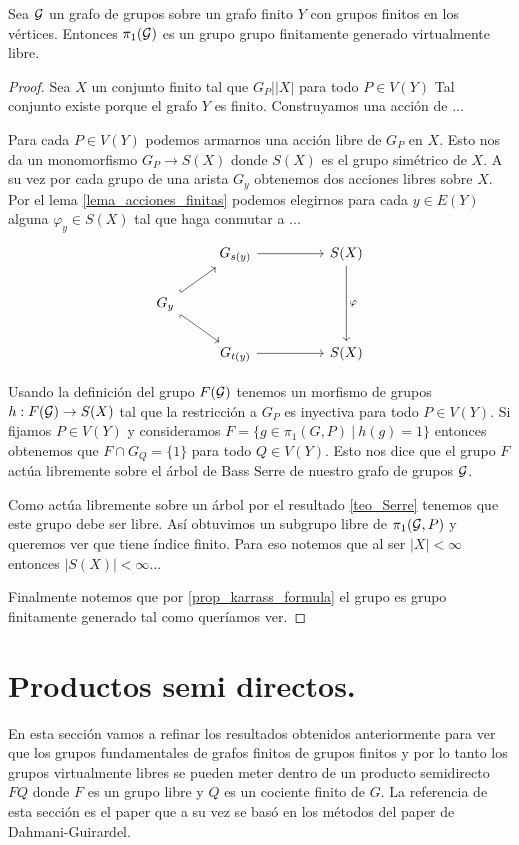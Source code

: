 \documentclass[tesis.tex]{subfiles}
\newcommand{\fg}{grupo finitamente generado }
\newcommand{\cG}{ {\cal G} }
\begin{document}
\begin{teo}\cite{karrass1973finite}
	Sea $\cal G$ un grafo de grupos sobre un grafo finito $Y$ con grupos finitos en los vértices.
	Entonces $\pi_1(\cal G)$ es un grupo \fg virtualmente libre.
\end{teo}
\begin{proof}
	Sea $X$ un conjunto finito tal que $G_P | |X|$ para todo $P \in V(Y)$
	Tal conjunto existe porque el grafo $Y$ es finito.
	Construyamos una acción de ...
	
	
	Para cada $P \in V(Y)$ podemos armarnos una acción libre de $G_P$ en $X$. 
	Esto nos da un monomorfismo $G_P \to S(X)$ donde $S(X)$ es el grupo simétrico de $X$.
	A su vez por cada grupo de una arista $G_y$ obtenemos dos acciones libres sobre $X$.
	Por el lema \ref{lema_acciones_finitas} podemos elegirnos para cada $y \in E(Y)$ alguna $\varphi_y \in S(X)$ tal que haga conmutar a ...
	\[\begin{tikzcd}
		& {G_{s(y)}} && {S(X)} \\
		{G_y} \\
		& {G_{t(y)}} && {S(X)}
		\arrow[from=1-2, to=1-4]
		\arrow[from=3-2, to=3-4]
		\arrow[hook, from=2-1, to=1-2]
		\arrow[hook', from=2-1, to=3-2]
		\arrow["\varphi", from=1-4, to=3-4]
	\end{tikzcd}\]
	
	Usando la definición del grupo $F(\cG)$ tenemos un morfismo de grupos $h: F(\cG) \to S(X)$ tal que la restricción a $G_P$ es inyectiva para todo $P \in V(Y)$.
	Si fijamos $P \in V(Y)$ y consideramos $F = \{  g \in \pi_1(G,P) \ | \ h(g) = 1  \}$  entonces obtenemos que $F \cap G_Q = \{ 1 \}$ para todo $Q \in V(Y)$.
	Esto nos dice que el grupo $F$ actúa libremente sobre el árbol de Bass Serre de nuestro grafo de grupos $\cG$.
	
	Como actúa libremente sobre un árbol por el resultado \ref{teo_Serre} tenemos que este grupo debe ser libre. 
	Así obtuvimos un subgrupo libre de $\pi_1(\cG, P)$ y queremos ver que tiene índice finito.
	Para eso notemos que al ser $|X| < \infty$ entonces $|S(X)| < \infty$...
	
	Finalmente notemos que por \ref{prop_karrass_formula} el grupo es \fg tal como queríamos ver.
\end{proof}

\section{Productos semi directos.}

En esta sección vamos a refinar los resultados obtenidos anteriormente para ver que los grupos fundamentales de grafos finitos de grupos finitos y por lo tanto los grupos virtualmente libres se pueden meter dentro de un producto semidirecto $F Q$ donde $F$ es un grupo libre y $Q$ es un cociente finito de $G$.
La referencia de esta sección es el paper \cite{} que a su vez se basó en los métodos del paper de Dahmani-Guirardel.
\end{document}
